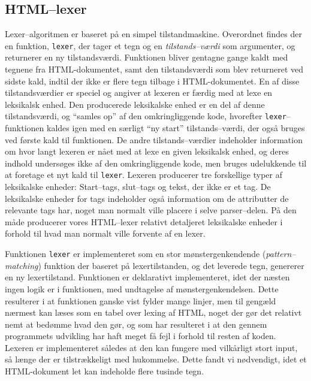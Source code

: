 \documentclass[a4paper,oneside,article]{memoir}
\begin{document}
\subsection{HTML--lexer}
\label{htmllexerimpl}
Lexer--algoritmen er baseret på en simpel tilstandmaskine. Overordnet
findes der en funktion, \texttt{lexer}, der tager et tegn og en
\textit{tilstands--værdi} som argumenter, og returnerer en ny
tilstandsværdi. Funktionen bliver gentagne gange kaldt med tegnene fra
HTML-dokumentet, samt den tilstandsværdi som blev returneret ved
sidste kald, indtil der ikke er flere tegn tilbage i
HTML-dokumentet. En af disse tilstandsværdier er speciel og angiver at
lexeren er færdig med at lexe en leksikalsk enhed. Den producerede
leksikalske enhed er en del af denne tilstandsværdi, og ``samles op''
af den omkringliggende kode, hvorefter \texttt{lexer}--funktionen
kaldes igen med en særligt ``ny start'' tilstands--værdi, der også
bruges ved første kald til funktionen. De andre tilstands--værdier
indeholder information om hvor langt lexeren er nået med at lexe en
given leksikalsk enhed, og deres indhold undersøges ikke af den
omkringliggende kode, men bruges udelukkende til at foretage et nyt
kald til \texttt{lexer}. Lexeren producerer tre forskellige typer af
leksikalske enheder: Start--tags, slut--tags og tekst, der ikke er et
tag. De leksikalske enheder for tags indeholder også information om de
attributter de relevante tags har, noget man normalt ville placere i
selve parser--delen. På den måde producerer vores HTML--lexer relativt
detaljeret leksikalske enheder i forhold til hvad man normalt ville
forvente af en lexer.

Funktionen \texttt{lexer} er implementeret som en stor
mønstergenkendende (\textit{pattern--matching}) funktion der baseret
på lexertilstanden, og det leverede tegn, genererer en ny
lexertilstand. Funktionen er deklarativt implementeret, idet der
næsten ingen logik er i funktionen, med undtagelse af
mønstergenkendelsen. Dette resulterer i at funktionen ganske vist
fylder mange linjer, men til gengæld nærmest kan læses som en tabel
over lexing af HTML, noget der gør det relativt nemt at bedømme hvad
den gør, og som har resulteret i at den gennem programmets udvikling
har haft meget få fejl i forhold til resten af koden. Lexeren er
implementeret således at den kan fungere med vilkårligt stort input,
så længe der er tilstrækkeligt med hukommelse. Dette fandt vi
nødvendigt, idet et HTML-dokument let kan indeholde flere tusinde
tegn. 
\end{document}
